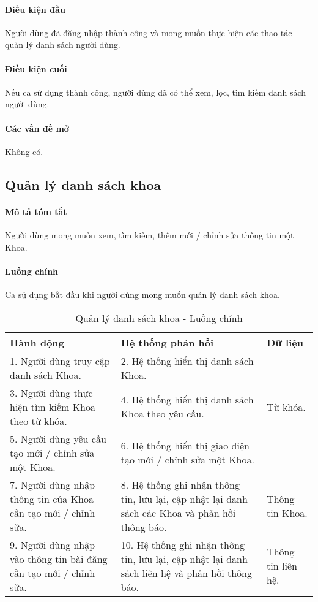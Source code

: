 \documentclass[./../main.tex]{subfiles}
\begin{document}
\paragraph*{Điều kiện đầu}

Người dùng đã đăng nhập thành công và mong muốn thực hiện các thao tác quản lý danh sách người dùng.

\paragraph*{Điều kiện cuối}

Nếu ca sử dụng thành công, người dùng đã có thể xem, lọc, tìm kiếm danh sách người dùng.

\paragraph*{Các vấn đề mở}

Không có.

\subsection{Quản lý danh sách khoa}

\paragraph*{Mô tả tóm tắt}

Người dùng mong muốn xem, tìm kiếm, thêm mới / chỉnh sửa thông tin một Khoa.

\paragraph*{Luồng chính} Ca sử dụng bắt đầu khi người dùng mong muốn quản lý danh sách khoa.

\begin{table}[H]
  \caption{Quản lý danh sách khoa - Luồng chính}
  \label{tab:admin_manage_orgs}
  \begin{tabularx}{\textwidth}{|X|X|X|}
    \hline
    \textbf{Hành động} & \textbf{Hệ thống phản hồi} & \textbf{Dữ liệu} \\ \hline
1. Người dùng truy cập danh sách Khoa. & 2. Hệ thống hiển thị danh sách Khoa. &  \\ \hline
3. Người dùng thực hiện tìm kiếm Khoa theo từ khóa. & 4. Hệ thống hiển thị danh sách Khoa theo yêu cầu. & Từ khóa. \\ \hline
5. Người dùng yêu cầu tạo mới / chỉnh sửa một Khoa. & 6. Hệ thống hiển thị giao diện tạo mới / chỉnh sửa một Khoa. &  \\ \hline
7. Người dùng nhập thông tin của Khoa cần tạo mới / chỉnh sửa. & 8. Hệ thống ghi nhận thông tin, lưu lại, cập nhật lại danh sách các Khoa và phản hồi thông báo. & Thông tin Khoa. \\ \hline
9. Người dùng nhập vào thông tin bài đăng cần tạo mới / chỉnh sửa. & 10. Hệ thống ghi nhận thông tin, lưu lại, cập nhật lại danh sách liên hệ và phản hồi thông báo. & Thông tin liên hệ. \\ \hline
  \end{tabularx}
\end{table}
\end{document}
